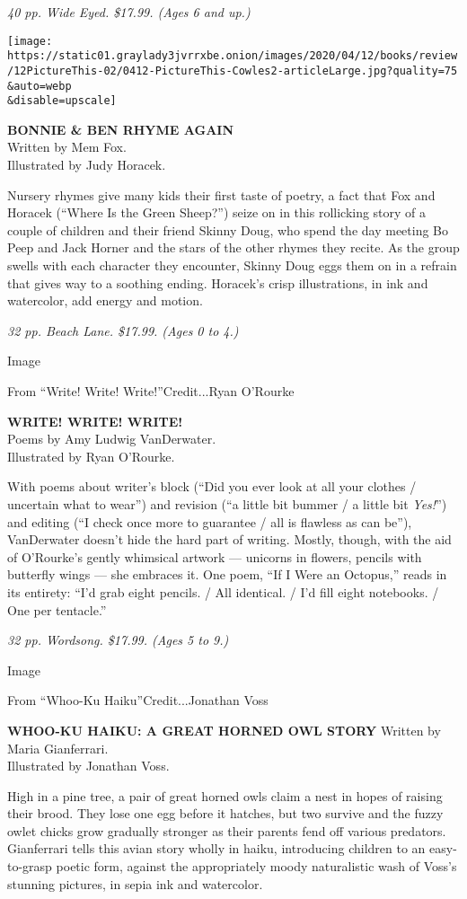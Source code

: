\emph{40 pp. Wide Eyed. \$17.99. (Ages 6 and up.)}

\texttt{[image: https://static01.graylady3jvrrxbe.onion/images/2020/04/12/books/review/12PictureThis-02/0412-PictureThis-Cowles2-articleLarge.jpg?quality=75\\\&auto=webp\\\&disable=upscale]}

\textbf{BONNIE \& BEN RHYME AGAIN}\\
Written by Mem Fox.\\
Illustrated by Judy Horacek.

Nursery rhymes give many kids their first taste of poetry, a fact that
Fox and Horacek (``Where Is the Green Sheep?'') seize on in this
rollicking story of a couple of children and their friend Skinny Doug,
who spend the day meeting Bo Peep and Jack Horner and the stars of the
other rhymes they recite. As the group swells with each character they
encounter, Skinny Doug eggs them on in a refrain that gives way to a
soothing ending. Horacek's crisp illustrations, in ink and watercolor,
add energy and motion.

\emph{32 pp. Beach Lane. \$17.99. (Ages 0 to 4.)}

Image

From ``Write! Write! Write!''Credit...Ryan O'Rourke

\textbf{WRITE! WRITE! WRITE!}\\
Poems by Amy Ludwig VanDerwater.\\
Illustrated by Ryan O'Rourke.

With poems about writer's block (``Did you ever look at all your clothes
/ uncertain what to wear'') and revision (``a little bit bummer / a
little bit \emph{Yes!}'') and editing (``I check once more to guarantee
/ all is flawless as can be''), VanDerwater doesn't hide the hard part
of writing. Mostly, though, with the aid of O'Rourke's gently whimsical
artwork --- unicorns in flowers, pencils with butterfly wings --- she
embraces it. One poem, ``If I Were an Octopus,'' reads in its entirety:
``I'd grab eight pencils. / All identical. / I'd fill eight notebooks. /
One per tentacle.''

\emph{32 pp. Wordsong. \$17.99. (Ages 5 to 9.)}

Image

From ``Whoo-Ku Haiku''Credit...Jonathan Voss

\textbf{WHOO-KU HAIKU: A GREAT HORNED OWL STORY} Written by Maria
Gianferrari.\\
Illustrated by Jonathan Voss.

High in a pine tree, a pair of great horned owls claim a nest in hopes
of raising their brood. They lose one egg before it hatches, but two
survive and the fuzzy owlet chicks grow gradually stronger as their
parents fend off various predators. Gianferrari tells this avian story
wholly in haiku, introducing children to an easy-to-grasp poetic form,
against the appropriately moody naturalistic wash of Voss's stunning
pictures, in sepia ink and watercolor.

